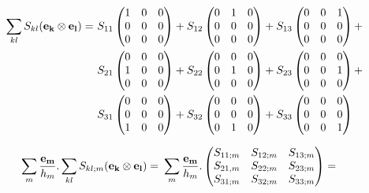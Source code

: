 \documentclass[11pt]{article}
\begin{document}
\begin{align}
\sum_{kl} S_{kl} ({\bf{e_k}} \otimes {\bf{e_l}}) = & \
  S_{11}\begin{pmatrix}
 1 & 0 & 0 \\
 0 & 0 & 0 \\
 0 & 0 & 0 
       \end{pmatrix} +        
  S_{12}\begin{pmatrix}
 0 & 1 & 0 \\
 0 & 0 & 0 \\
 0 & 0 & 0 
       \end{pmatrix} +
  S_{13}\begin{pmatrix}
 0 & 0 & 1 \\
 0 & 0 & 0 \\
 0 & 0 & 0 
       \end{pmatrix} + \\
  & \ S_{21}\begin{pmatrix}
 0 & 0 & 0 \\
 1 & 0 & 0 \\
 0 & 0 & 0 
       \end{pmatrix} +        
  S_{22}\begin{pmatrix}
 0 & 0 & 0 \\
 0 & 1 & 0 \\
 0 & 0 & 0 
       \end{pmatrix} +
  S_{23}\begin{pmatrix}
 0 & 0 & 0 \\
 0 & 0 & 1 \\
 0 & 0 & 0 
       \end{pmatrix} + \\
 & \ S_{31}\begin{pmatrix}
 0 & 0 & 0 \\
 0 & 0 & 0 \\
 1 & 0 & 0 
       \end{pmatrix} +        
  S_{32}\begin{pmatrix}
 0 & 0 & 0 \\
 0 & 0 & 0 \\
 0 & 1 & 0 
       \end{pmatrix} +
  S_{33}\begin{pmatrix}
 0 & 0 & 0 \\
 0 & 0 & 0 \\
 0 & 0 & 1 
       \end{pmatrix} 
\end{align}


\begin{align}
\sum_m \frac{{\bf{e_m}}}{h_m} . \sum_{kl} S_{kl;m} ({\bf{e_k}} \otimes {\bf{e_l}}) = & \ \sum_m \frac{{\bf{e_m}}}{h_m} .
\begin{pmatrix}
 S_{11;m} &  S_{12;m} &  S_{13;m}  \\
 S_{21,m} &  S_{22;m} &  S_{23;m} \\
 S_{31;m} &  S_{32;m} &  S_{33;m} 
\end{pmatrix} = 
\end{align}
\end{document}
